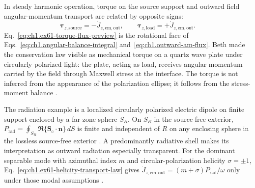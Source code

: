 In steady harmonic operation, torque on the source support and outward field angular-momentum transport are related by opposite signs:
\begin{equation}
\label{eq:ch1.ex61-torque-flux-preview}
\boldsymbol{\tau}_{z,\mathrm{source}}=-\dot J_{z,\mathrm{em,out}},
\qquad
\boldsymbol{\tau}_{z,\mathrm{load}}=+\dot J_{z,\mathrm{em,out}}.
\end{equation}
Eq.~\eqref{eq:ch1.ex61-torque-flux-preview} is the rotational face of Eqs.~\eqref{eq:ch1.angular-balance-integral} and~\eqref{eq:ch1.outward-am-flux}. Beth \cite{beth1936} made the conservation law visible as mechanical torque on a quartz wave plate under circularly polarized light: the plate, acting as load, receives angular momentum carried by the field through Maxwell stress at the interface. The torque is not inferred from the appearance of the polarization ellipse; it follows from the stress-moment balance \cite{beth1936,stratton1941}.

The radiation example is a localized circularly polarized electric dipole on finite support
enclosed by a far-zone sphere $S_R$. On $S_R$ in the source-free exterior,
$P_{\mathrm{rad}}=\oint_{S_R}\Re\{\mathbf{S}_\mathrm{c}\cdot\hat{\mathbf{n}}\}\,dS$ is
finite and independent of $R$ on any enclosing sphere in the lossless source-free exterior
\cite{stratton1941,beth1936}. A predominantly radiative shell makes its interpretation as outward radiation especially transparent. For the dominant separable mode with azimuthal index $m$ and
circular-polarization helicity $\sigma=\pm1$, Eq.~\eqref{eq:ch1.ex61-helicity-transport-law}
gives \(\dot J_{z,\mathrm{em,out}}=(m+\sigma)P_{\mathrm{rad}}/\omega\) only under those
modal assumptions \cite{stratton1941}.

